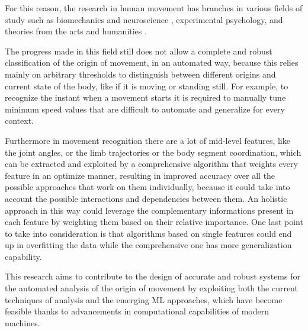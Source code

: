 For this reason, the research in human movement has branches in various fields of study such as biomechanics and neuroscience \cite{vaessen:2019}, 
experimental psychology, and theories from the arts and humanities \cite{camurri:2016}. 

The progress made in this field still does not allow a complete and robust classification of the origin of movement, in an automated way, 
because this relies mainly on arbitrary thresholds to distinguish between different origins and current state of the body, 
like if it is moving or standing still. 
For example, to recognize the instant when a movement starts it is required to manually tune 
minimum speed values that are difficult to automate and generalize for every context. 

Furthermore in movement recognition there are a lot of mid-level features, like the joint angles,
or the limb trajectories or the body segment coordination, which can be extracted and exploited by a comprehensive algorithm 
that weights every feature in an optimize manner, resulting in improved accuracy over all the possible approaches 
that work on them individually, because it could take into account the possible interactions and dependencies between them. 
An holistic approach in this way could leverage the complementary informations present in each feature by weighting them 
based on their relative importance. 
One last point to take into consideration is that algorithms based on single features could end up in overfitting the data
while the comprehensive one has more generalization capability. 

This research aims to contribute to the design of accurate and robust systems for the automated analysis of the origin of movement
by exploiting both the current techniques of analysis and the emerging ML approaches, 
which have become feasible thanks to advancements in computational capabilities of modern machines. 

